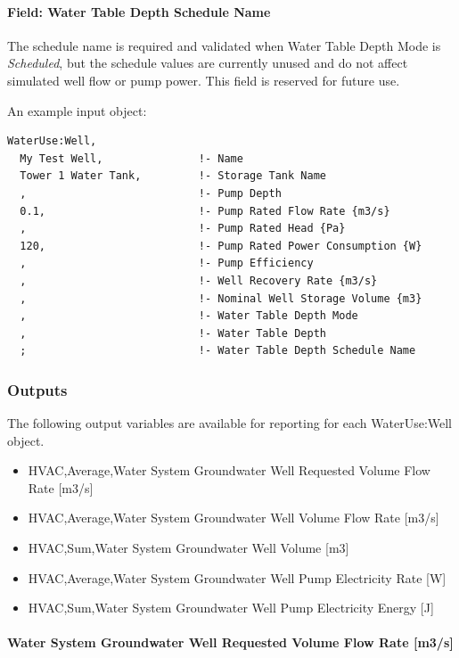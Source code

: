 \paragraph{Field: Water Table Depth Schedule Name}\label{field-water-table-depth-schedule-name}

The schedule name is required and validated when Water Table Depth Mode is \emph{Scheduled}, but the schedule values are currently unused and do not affect simulated well flow or pump power. This field is reserved for future use.

An example input object:

\begin{lstlisting}
WaterUse:Well,
  My Test Well,               !- Name
  Tower 1 Water Tank,         !- Storage Tank Name
  ,                           !- Pump Depth
  0.1,                        !- Pump Rated Flow Rate {m3/s}
  ,                           !- Pump Rated Head {Pa}
  120,                        !- Pump Rated Power Consumption {W}
  ,                           !- Pump Efficiency
  ,                           !- Well Recovery Rate {m3/s}
  ,                           !- Nominal Well Storage Volume {m3}
  ,                           !- Water Table Depth Mode
  ,                           !- Water Table Depth
  ;                           !- Water Table Depth Schedule Name
\end{lstlisting}

\subsubsection{Outputs}\label{outputs-4-019}

The following output variables are available for reporting for each WaterUse:Well object.

\begin{itemize}
\item
  HVAC,Average,Water System Groundwater Well Requested Volume Flow Rate {[}m3/s{]}
\item
  HVAC,Average,Water System Groundwater Well Volume Flow Rate {[}m3/s{]}
\item
  HVAC,Sum,Water System Groundwater Well Volume {[}m3{]}
\item
  HVAC,Average,Water System Groundwater Well Pump Electricity Rate {[}W{]}
\item
  HVAC,Sum,Water System Groundwater Well Pump Electricity Energy {[}J{]}
\end{itemize}

\paragraph{Water System Groundwater Well Requested Volume Flow Rate {[}m3/s{]}}\label{water-system-groundwater-well-requested-volume-flow-rate-m3s}

